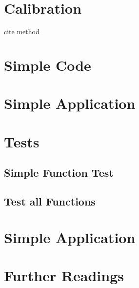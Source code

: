 \section{Calibration}

cite method

\section{Simple Code}


\section{Simple Application}



\section{Tests}

\subsection{Simple Function Test}

\subsection{Test all Functions}

\section{Simple Application}


\section{Further Readings}

